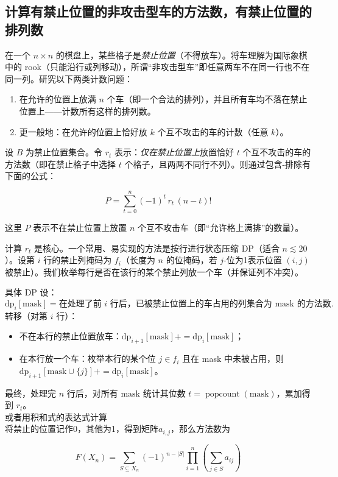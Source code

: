 \subsection{计算有禁止位置的非攻击型车的方法数，有禁止位置的排列数}
在一个 \(n\times n\) 的棋盘上，某些格子是\emph{禁止位置}（不得放车）。将车理解为国际象棋中的 rook（只能沿行或列移动），所谓“非攻击型车”即任意两车不在同一行也不在同一列。研究以下两类计数问题：
\begin{enumerate}
  \item 在允许的位置上放满 \(n\) 个车（即一个合法的排列），并且所有车均不落在禁止位置上——计数所有这样的排列数。
  \item 更一般地：在允许的位置上恰好放 \(k\) 个互不攻击的车的计数（任意 \(k\)）。
\end{enumerate}

\begin{theorem}
  设 \(B\) 为禁止位置集合。令 \(r_t\) 表示：\emph{仅在禁止位置上}放置恰好 \(t\) 个互不攻击的车的方法数（即在禁止格子中选择 \(t\) 个格子，且两两不同行不列）。则通过包含-排除有下面的公式：

\[
\boxed{\;P = \sum_{t=0}^{n} (-1)^t\, r_t \, (n-t)!\;}
\]

这里 \(P\) 表示不在禁止位置上放置 \(n\) 个互不攻击车（即“允许格上满排”的数量）。
\end{theorem}

计算 \(r_t\) 是核心。一个常用、易实现的方法是按行进行状态压缩 DP（适合 \(n\lesssim 20\)）。设第 \(i\) 行的禁止列掩码为 \(f_i\)（长度为 \(n\) 的位掩码，若 \(j\)-位为1表示位置 \((i,j)\) 被禁止）。我们枚举每行是否在该行的某个禁止列放一个车（并保证列不冲突）。

具体 DP 设：
\[
\text{dp}_{i}[\text{mask}] = \text{在处理了前 }i\text{ 行后，已被禁止位置上的车占用的列集合为 mask 的方法数.}
\]
转移（对第 \(i\) 行）：
\begin{itemize}
  \item 不在本行的禁止位置放车：\(\text{dp}_{i+1}[\text{mask}] += \text{dp}_i[\text{mask}]\)；
  \item 在本行放一个车：枚举本行的某个位 \(j\in f_i\) 且在 mask 中未被占用，则
  \(\text{dp}_{i+1}[\text{mask}\cup\{j\}] += \text{dp}_i[\text{mask}]\)。
\end{itemize}
最终，处理完 \(n\) 行后，对所有 \(\text{mask}\) 统计其位数 \(t=\operatorname{popcount}(\text{mask})\)，累加得到 \(r_t\)。\\
或者用积和式的表达式计算\\
将禁止的位置记作0，其他为1，得到矩阵$a_{i,j}$，那么方法数为
\begin{theorem}
$$
F(X_n)=\sum_{S\subseteq X_n} (-1)^{n-|S|}\prod_{i=1}^{n}\left(\sum_{j\in S} a_{ij}\right)
$$
\end{theorem}

